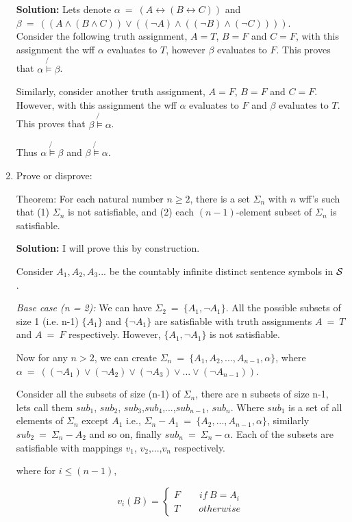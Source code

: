\documentclass[12pt,letterpaper]{article}
\def\ge{\geqslant}
\begin{document}
\begin{enumerate}
\textbf{Solution:}
Lets denote $\alpha\ =\ (A \leftrightarrow (B \leftrightarrow C))$ and $\beta\ =\ ((A\land (B\land C)) \lor ((\neg A) \land ((\neg B) \land (\neg C))))$. \\
Consider the following truth assignment, $A=T$, $B=F$ and $C=F$, with this assignment the wff $\alpha$ evaluates to $T$, however $\beta$ evaluates to $F$. This proves that $\alpha \not{\models} \beta$.

Similarly, consider another truth assignment, $A=F$, $B=F$ and $C=F$. However, with this assignment the wff $\alpha$ evaluates to $F$ and $\beta$ evaluates to $T$. This proves that $\beta \not{\models} \alpha$.

Thus $\alpha \not{\models} \beta$ and $\beta \not{\models} \alpha$.
\item
  Prove or disprove:

  {\sc Theorem:}
  For each natural number $n\ge 2$,
  there is a set $\Sigma_n$ with $n$ wff's such that
  (1) $\Sigma_n$ is not satisfiable, and
  (2) each $(n{-}1)$-element subset of $\Sigma_n$
  is satisfiable.
  
  \textbf{Solution:} I will prove this by construction.  
  
  Consider $A_{1}, A_{2}, A_{3}...$ be the countably infinite distinct sentence symbols in $\cal S$. 
  
  \textit{Base case (n = 2):} We can have $\Sigma_{2}\ =\ \{A_{1}, \lnot A_{1}\}$. All the possible subsets of size 1 (i.e. n-1) $\{A_{1}\}$ and $\{\lnot A_{1}\}$ are satisfiable with truth assignments $A\ =\ T$ and $A\ =\ F$ respectively. However, $\{A_{1}, \lnot A_{1}\}$ is not satisfiable.
  
  Now for any $n > 2$, we can create $\Sigma_{n}\ =\ \{A_{1}, A_{2},...,A_{n-1}, \alpha\}$, where $\alpha\ =\ ((\lnot A_{1}) \lor (\lnot A_{2}) \lor (\lnot A_{3}) \lor ... \lor (\lnot A_{n-1}))$. 
  
  Consider all the subsets of size (n-1) of $\Sigma_{n}$, there are n subsets of size n-1, lets call them $sub_{1}$, $sub_{2}$, $sub_{3}$,$sub_{4}$,...,$sub_{n-1}$, $sub_{n}$. Where $sub_{1}$ is a set of all elements of $\Sigma_{n}$ except $A_{1}$ i.e., $\Sigma_{n} - A_{1}\ =\ \{A_{2},...,A_{n-1}, \alpha\}$, similarly  $sub_{2}\ =\ \Sigma_{n} - A_{2}$ and so on, finally $sub_{n}\ =\ \Sigma_{n} - \alpha$. Each of the subsets are satisfiable with mappings $v_{1}$, $v_{2}$,...,$v_{n}$ respectively.
  
  where for $i \leq (n-1)$,
  
  \begin{equation}
   v_{i}(B) = \left\{
                \begin{array}{ll}
                  F\qquad if\ B = A_{i} \\
                  T\qquad otherwise
                \end{array}
              \right.
  \end{equation}
  

\end{enumerate}
\end{document}
